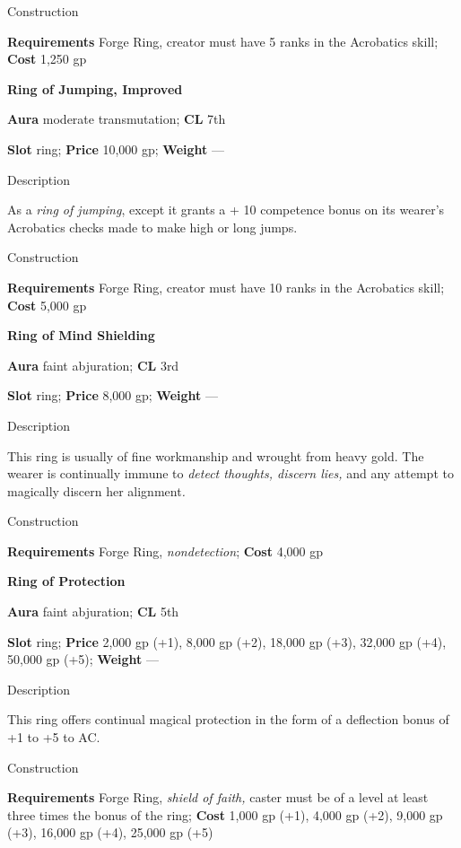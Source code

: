 Construction
				
\textbf{Requirements} Forge Ring, creator must have 5 ranks in the Acrobatics skill; \textbf{Cost }1,250 gp
				
\textbf{Ring of Jumping, Improved}
				
\textbf{Aura} moderate transmutation;\textbf{ CL }7th
				
\textbf{Slot} ring; \textbf{Price} 10,000 gp; \textbf{Weight} ---
				
Description
				
As a \textit{ring of jumping}, except it grants a +
10 competence
 bonus on its wearer's Acrobatics checks made to make high or long jumps. 
				
Construction
				
\textbf{Requirements} Forge Ring, creator must have 10 ranks in the Acrobatics skill; \textbf{Cost }5,000 gp
				
\textbf{Ring of Mind Shielding}
				
\textbf{Aura} faint abjuration;\textbf{ CL }3rd
				
\textbf{Slot} ring; \textbf{Price} 8,000 gp; \textbf{Weight} ---
				
Description
				
This ring is usually of fine workmanship and wrought from heavy gold. The wearer is continually immune to \textit{detect thoughts, discern lies, }and any attempt to magically discern her alignment\textit{.} 
				
Construction
				
\textbf{Requirements} Forge Ring, \textit{nondetection}; \textbf{Cost }4,000 gp
				
\textbf{Ring of Protection}
				
\textbf{Aura} faint abjuration;\textbf{ CL }5th
				
\textbf{Slot} ring; \textbf{Price} 2,000 gp (+1), 8,000 gp (+2), 18,000 gp (+3), 32,000 gp (+4), 50,000 gp (+5); \textbf{Weight} ---
				
Description
				
This ring offers continual magical protection in the form of a deflection bonus of 
+1
 to +5 to AC. 
				
Construction
				
\textbf{Requirements} Forge Ring, \textit{shield of faith,} caster must be of a level at least three times the bonus of the ring; \textbf{Cost }1,000 gp (+1), 4,000 gp (+2), 9,000 gp (+3), 16,000 gp (+4), 25,000 gp (+5)
				
